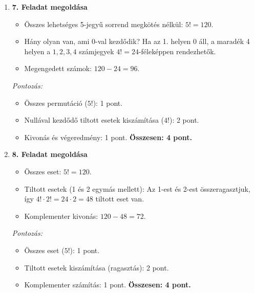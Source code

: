 \documentclass[12pt,a4paper]{article}
\begin{document}
\begin{enumerate}
    \vspace{0.3cm}

    \item \textbf{7. Feladat megoldása}
    \begin{itemize}
        \item Összes lehetséges 5-jegyű sorrend megkötés nélkül: $5! = 120$.
        \item Hány olyan van, ami 0-val kezdődik? Ha az 1. helyen 0 áll, a maradék 4 helyen a $1, 2, 3, 4$ számjegyek $4! = 24$-féleképpen rendezhetők.
        \item Megengedett számok: $120 - 24 = 96$.
    \end{itemize}
    \emph{Pontozás:}
    \begin{itemize}
        \item Összes permutáció ($5!$): 1 pont.
        \item Nullával kezdődő tiltott esetek kiszámítása ($4!$): 2 pont.
        \item Kivonás és végeredmény: 1 pont.
        \textbf{Összesen: 4 pont.}
    \end{itemize}

    \vspace{0.3cm}

    \item \textbf{8. Feladat megoldása}
    \begin{itemize}
        \item Összes eset: $5! = 120$.
        \item Tiltott esetek (1 és 2 egymás mellett): Az 1-est és 2-est összeragasztjuk, így $4! \cdot 2! = 24 \cdot 2 = 48$ tiltott eset van.
        \item Komplementer kivonás: $120 - 48 = 72$.
    \end{itemize}
    \emph{Pontozás:}
    \begin{itemize}
        \item Összes eset ($5!$): 1 pont.
        \item Tiltott esetek kiszámítása (ragasztás): 2 pont.
        \item Komplementer számítás: 1 pont.
        \textbf{Összesen: 4 pont.}
    \end{itemize}

    \vspace{0.3cm}


\end{enumerate}
\end{document}
